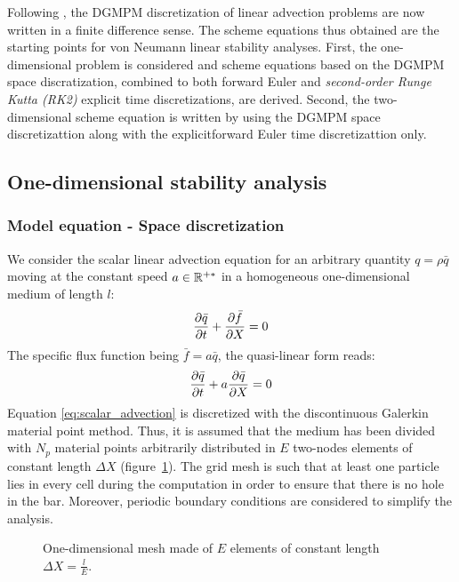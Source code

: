 Following \cite{Hirsch}, the DGMPM discretization of linear advection problems are now written in a finite difference sense. The scheme equations thus obtained are the starting points for von Neumann linear stability analyses. First, the one-dimensional problem is considered and scheme equations based on the DGMPM space discratization, combined to both forward Euler and \textit{second-order Runge Kutta (RK2)} explicit time discretizations, are derived. Second, the two-dimensional scheme equation is written by using the DGMPM space discretizattion along with the explicitforward Euler time discretizattion only.

\subsection{One-dimensional stability analysis}
\subsubsection*{Model equation - Space discretization}
We consider the scalar linear advection equation for an arbitrary quantity $q=\rho \bar{q}$ moving at the constant speed $a \in \mathbb{R}^{+*}$ in a homogeneous one-dimensional medium of length $l$:
\begin{equation}
\frac{\partial \bar{q}}{\partial t} + \frac{\partial \bar{f}}{\partial X} = 0 
\end{equation}
The specific flux function being $\bar{f} = a\bar{q}$, the quasi-linear form reads:
\begin{equation}
\frac{\partial \bar{q}}{\partial t} + a\frac{\partial \bar{q}}{\partial X} = 0 \label{eq:scalar_advection}
\end{equation}
Equation \eqref{eq:scalar_advection} is discretized with the discontinuous Galerkin material point method. Thus, it is assumed that the medium has been divided with $N_p$ material points arbitrarily distributed in $E$ two-nodes elements of constant length $\Delta X$ (figure~\ref{fig:1Dmesh}). The grid mesh is such that at least one particle lies in every cell during the computation in order to ensure that there is no hole in the bar. Moreover, periodic boundary conditions are considered to simplify the analysis.
\begin{figure}[h!]
  \centering

  \caption{One-dimensional mesh made of $E$ elements of constant length $\Delta X = \frac{l}{E}$.}\label{fig:1Dmesh}
\end{figure}

